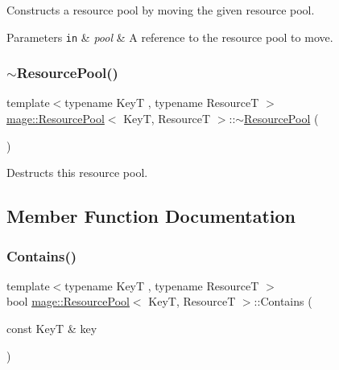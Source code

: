 Constructs a resource pool by moving the given resource pool.


\begin{DoxyParams}[1]{Parameters}
\mbox{\tt in}  & {\em pool} & A reference to the resource pool to move. \\
\hline
\end{DoxyParams}
\mbox{\label{classmage_1_1_resource_pool_ad5dceb2a1cbd47ced5cb6ad269f4510e}} 
\subsubsection{\texorpdfstring{$\sim$\+Resource\+Pool()}{~ResourcePool()}}
{\footnotesize\ttfamily template$<$typename KeyT , typename ResourceT $>$ \\
\mbox{\hyperlink{classmage_1_1_resource_pool}{mage\+::\+Resource\+Pool}}$<$ KeyT, ResourceT $>$\+::$\sim$\mbox{\hyperlink{classmage_1_1_resource_pool}{Resource\+Pool}} (\begin{DoxyParamCaption}{ }\end{DoxyParamCaption})\hspace{0.3cm}{\ttfamily [noexcept]}}

Destructs this resource pool. 

\subsection{Member Function Documentation}
\mbox{\label{classmage_1_1_resource_pool_a36665c107134816d3e72322e9c80bebd}} 
\subsubsection{\texorpdfstring{Contains()}{Contains()}}
{\footnotesize\ttfamily template$<$typename KeyT , typename ResourceT $>$ \\
bool \mbox{\hyperlink{classmage_1_1_resource_pool}{mage\+::\+Resource\+Pool}}$<$ KeyT, ResourceT $>$\+::Contains (\begin{DoxyParamCaption}\item[{const KeyT \&}]{key }\end{DoxyParamCaption})\hspace{0.3cm}{\ttfamily [noexcept]}}


